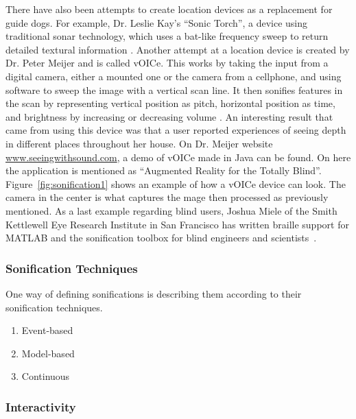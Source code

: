 There have also been attempts to create location devices as a replacement for guide dogs.
For example, Dr. Leslie Kay’s “Sonic Torch”, a device using traditional sonar technology, which uses a bat-like frequency sweep to return detailed textural information \cite*{Girvin2005}.
Another attempt at a location device is created by Dr. Peter Meijer and is called vOICe. 
This works by taking the input from a digital camera, either a mounted one or the camera from a cellphone, and using software to sweep the image with a vertical scan line. 
It then sonifies features in the scan by representing vertical position as pitch, horizontal position as time, and brightness by increasing or decreasing volume \cite*{Girvin2005}. 
An interesting result that came from using this device was that a user reported experiences of seeing depth in different places throughout her house. On Dr. Meijer website \url{www.seeingwithsound.com}, a demo of vOICe made in Java can be found. 
On here the application is mentioned as “Augmented Reality for the Totally Blind”. 
Figure~\ref{fig:sonification1} shows an example of how a vOICe device can look. 
The camera in the center is what captures the mage then processed as previously mentioned.
As a last example regarding blind users, Joshua Miele of the Smith Kettlewell Eye Research Institute in San Francisco has written braille support for MATLAB and the sonification toolbox for blind engineers and scientists~\cite*{Girvin2005}. 



\subsubsection{Sonification Techniques} %
\label{ssub:sonification_techniques}

One way of defining sonifications is describing them according to their sonification techniques.

\begin{enumerate}
    \item Event-based
    \item Model-based
    \item Continuous
\end{enumerate}


\subsubsection*{Interactivity} %
\label{ssub:interactivity}

